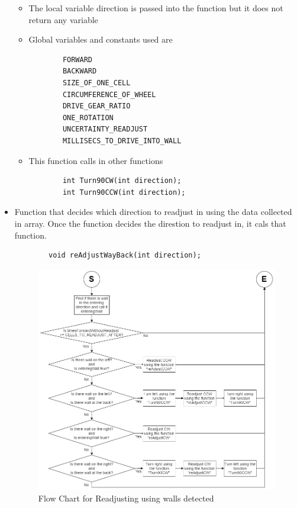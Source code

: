 \documentclass[11pt]{article}
\begin{document}
\begin{itemize}
\begin{figure}[htp]
\label{}
\end{figure}
	\begin{itemize}
	\item The local variable direction is passed into the function but it does not return any variable
	\item Global variables and constants used are
	\begin{verbatim}
		FORWARD
		BACKWARD
		SIZE_OF_ONE_CELL
		CIRCUMFERENCE_OF_WHEEL
		DRIVE_GEAR_RATIO
		ONE_ROTATION
		UNCERTAINTY_READJUST
		MILLISECS_TO_DRIVE_INTO_WALL
	\end{verbatim}
	\item This function calls in other functions
	\begin{verbatim}
		int Turn90CW(int direction);
		int Turn90CCW(int direction);
	\end{verbatim}
	\end{itemize}
\newpage
\item Function that decides which direction to readjust in using the data collected in array. Once the function decides the direstion to readjust in, it cals that function.
	\begin{verbatim}
		void reAdjustWayBack(int direction);
	\end{verbatim}
\begin{figure}[htp]
\centering
\includegraphics[scale=0.46]{images/Software_Flowchart/reAdjustWayBack.png}
\caption{Flow Chart for Readjusting using walls detected}

\end{figure}
\end{itemize}
\end{document}

